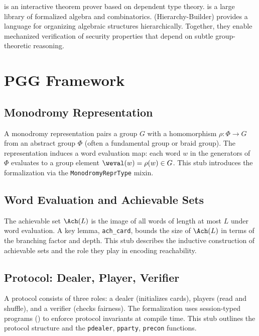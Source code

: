 \documentclass[11pt,a4paper]{article}
\begin{document}
\Rocq is an interactive theorem prover based on dependent type theory.
\MathComp is a large library of formalized algebra and combinatorics.
\HB (Hierarchy-Builder) provides a language for organizing algebraic structures hierarchically.
Together, they enable mechanized verification of security properties that depend on subtle group-theoretic reasoning.

\section{PGG Framework}
\label{sec:pgg}

\subsection{Monodromy Representation}
\label{sec:pgg-mono}

A monodromy representation pairs a group $G$ with a homomorphism $\rho : \Phi \to G$ from an abstract group $\Phi$ (often a fundamental group or braid group).
The representation induces a word evaluation map: each word $w$ in the generators of $\Phi$ evaluates to a group element $\weval(w) = \rho(w) \in G$.
This stub introduces the \Rocq formalization via the \texttt{MonodromyReprType} mixin.

\subsection{Word Evaluation and Achievable Sets}
\label{sec:pgg-weval}

The achievable set $\Ach(L)$ is the image of all words of length at most $L$ under word evaluation.
A key lemma, \texttt{ach\_card}, bounds the size of $\Ach(L)$ in terms of the branching factor and depth.
This stub describes the inductive construction of achievable sets and the role they play in encoding reachability.

\subsection{Protocol: Dealer, Player, Verifier}
\label{sec:pgg-protocol}

A \pgg protocol consists of three roles: a dealer (initializes cards), players (read and shuffle), and a verifier (checks fairness).
The formalization uses session-typed programs (\piSMC) to enforce protocol invariants at compile time.
This stub outlines the protocol structure and the \texttt{pdealer}, \texttt{pparty}, \texttt{precon} functions.
\end{document}

